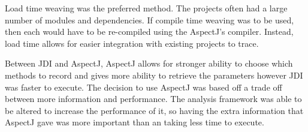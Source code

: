 Load time weaving was the preferred method. The projects often had a large number of modules and dependencies. If compile time weaving was to be used, then each would have to be re-compiled using the AspectJ's compiler. Instead, load time allows for easier integration with existing projects to trace.

Between JDI and AspectJ, AspectJ allows for stronger ability to choose which methods to record and gives more ability to retrieve the parameters however JDI was faster to execute. The decision to use AspectJ was based off a trade off between more information and performance. The analysis framework was able to be altered to increase the performance of it, so having the extra information that AspectJ gave was more important than an taking less time to execute.